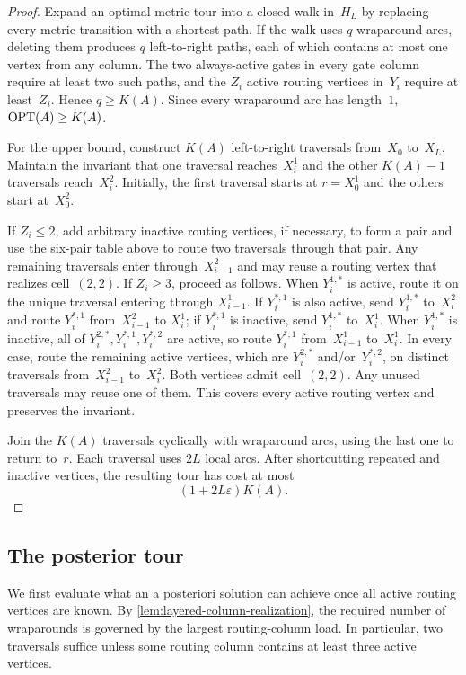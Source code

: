 \documentclass[12pt,a4paper,oneside]{report}
\begin{document}
\begin{proof}
Expand an optimal metric tour into a closed walk in~$H_L$ by replacing every
metric transition with a shortest path.  If the walk uses $q$ wraparound
arcs, deleting them produces $q$ left-to-right paths, each of which contains
at most one vertex from any column.  The two always-active gates in every
gate column require at least two such paths, and the $Z_i$ active routing
vertices in~$Y_i$ require at least~$Z_i$.  Hence $q\ge K(A)$.  Since every
wraparound arc has length~$1$, $\operatorname{OPT}(A)\ge K(A)$.

For the upper bound, construct $K(A)$ left-to-right traversals from~$X_0$
to~$X_L$.  Maintain the invariant that one traversal reaches~$X_i^1$ and the
other $K(A)-1$ traversals reach~$X_i^2$.  Initially, the first traversal
starts at $r=X_0^1$ and the others start at~$X_0^2$.

If $Z_i\le2$, add arbitrary inactive routing vertices, if necessary, to form
a pair and use the six-pair table above to route two traversals through that
pair.  Any remaining traversals enter through~$X_{i-1}^2$ and may reuse a
routing vertex that realizes cell~$(2,2)$.  If $Z_i\ge3$, proceed as follows.
When $Y_i^{1,\ast}$ is active, route it on the unique traversal entering
through $X_{i-1}^1$.  If $Y_i^{\ast,1}$ is also active, send
$Y_i^{1,\ast}$ to~$X_i^2$ and route $Y_i^{\ast,1}$ from~$X_{i-1}^2$ to
$X_i^1$; if $Y_i^{\ast,1}$ is inactive, send $Y_i^{1,\ast}$ to~$X_i^1$.
When $Y_i^{1,\ast}$ is inactive, all of
$Y_i^{2,\ast},Y_i^{\ast,1},Y_i^{\ast,2}$ are active, so route
$Y_i^{\ast,1}$ from~$X_{i-1}^1$ to~$X_i^1$.  In every case, route the
remaining active vertices, which are $Y_i^{2,\ast}$ and/or~$Y_i^{\ast,2}$,
on distinct traversals from~$X_{i-1}^2$ to~$X_i^2$.  Both vertices admit
cell~$(2,2)$.  Any unused traversals may reuse one of them.  This covers every
active routing vertex and preserves the invariant.

Join the $K(A)$ traversals cyclically with wraparound arcs, using the last
one to return to~$r$.  Each traversal uses $2L$ local arcs.  After
shortcutting repeated and inactive vertices, the resulting tour has cost at
most
\[
    (1+2L\varepsilon)K(A).
\]
\end{proof}

\subsection{The posterior tour}\label{sec:posterior-tour}

We first evaluate what an a posteriori solution can achieve once all active
routing vertices are known.  By
\cref{lem:layered-column-realization}, the required number of wraparounds is
governed by the largest routing-column load.  In particular, two traversals
suffice unless some routing column contains at least three active vertices.
\end{document}
